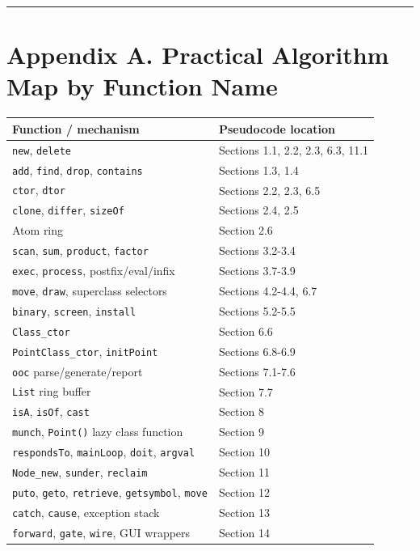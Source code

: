\documentclass[11pt]{article}
\begin{document}
\begin{center}\rule{0.5\linewidth}{0.5pt}\end{center}

\section{Appendix A. Practical Algorithm Map by Function
Name}\label{appendix-a.-practical-algorithm-map-by-function-name}

\begin{longtable}[]{@{}ll@{}}
\toprule\noalign{}
Function / mechanism & Pseudocode location \\
\midrule\noalign{}
\endhead
\bottomrule\noalign{}
\endlastfoot
\texttt{new}, \texttt{delete} &
Sections 1.1, 2.2, 2.3, 6.3, 11.1 \\
\texttt{add}, \texttt{find},
\texttt{drop}, \texttt{contains} &
Sections 1.3, 1.4 \\
\texttt{ctor}, \texttt{dtor} &
Sections 2.2, 2.3, 6.5 \\
\texttt{clone}, \texttt{differ},
\texttt{sizeOf} & Sections 2.4, 2.5 \\
Atom ring & Section 2.6 \\
\texttt{scan}, \texttt{sum},
\texttt{product}, \texttt{factor} &
Sections 3.2-3.4 \\
\texttt{exec}, \texttt{process},
postfix/eval/infix & Sections 3.7-3.9 \\
\texttt{move}, \texttt{draw},
superclass selectors & Sections 4.2-4.4, 6.7 \\
\texttt{binary}, \texttt{screen},
\texttt{install} & Sections 5.2-5.5 \\
\texttt{Class\_ctor} & Section 6.6 \\
\texttt{PointClass\_ctor},
\texttt{initPoint} & Sections 6.8-6.9 \\
\texttt{ooc} parse/generate/report & Sections
7.1-7.6 \\
\texttt{List} ring buffer & Section 7.7 \\
\texttt{isA}, \texttt{isOf},
\texttt{cast} & Section 8 \\
\texttt{munch}, \texttt{Point()} lazy
class function & Section 9 \\
\texttt{respondsTo},
\texttt{mainLoop}, \texttt{doit},
\texttt{argval} & Section 10 \\
\texttt{Node\_new}, \texttt{sunder},
\texttt{reclaim} & Section 11 \\
\texttt{puto}, \texttt{geto},
\texttt{retrieve}, \texttt{getsymbol},
\texttt{move} & Section 12 \\
\texttt{catch}, \texttt{cause},
exception stack & Section 13 \\
\texttt{forward}, \texttt{gate},
\texttt{wire}, GUI wrappers & Section 14 \\
\end{longtable}
\end{document}
